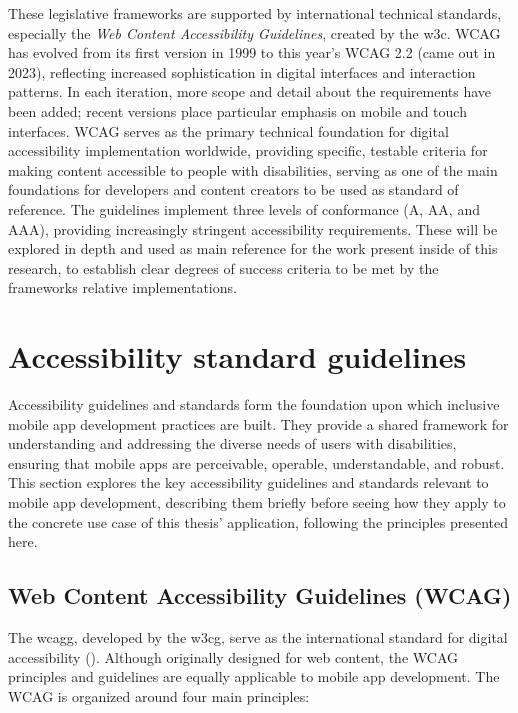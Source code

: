 These legislative frameworks are supported by international technical standards, especially the \textit{Web Content Accessibility Guidelines}, created by the \acrshort{w3c}. WCAG has evolved from its first version in 1999 to this year's WCAG 2.2 (came out in 2023), reflecting increased sophistication in digital interfaces and interaction patterns. In each iteration, more scope and detail about the requirements have been added; recent versions place particular emphasis on mobile and touch interfaces. WCAG serves as the primary technical foundation for digital accessibility implementation worldwide, providing specific, testable criteria for making content accessible to people with disabilities, serving as one of the main foundations for developers and content creators to be used as standard of reference. The guidelines implement three levels of conformance (A, AA, and AAA), providing increasingly stringent accessibility requirements. These will be explored in depth and used as main reference for the work present inside of this research, to establish clear degrees of success criteria to be met by the frameworks relative implementations.

\section{Accessibility standard guidelines}
\label{sec:accessibility-guidelines}

Accessibility guidelines and standards form the foundation upon which inclusive mobile app development practices are built. They provide a shared framework for understanding and addressing the diverse needs of users with disabilities, ensuring that mobile apps are perceivable, operable, understandable, and robust. This section explores the key accessibility guidelines and standards relevant to mobile app development, describing them briefly before seeing how they apply to the concrete use case of this thesis' application, following the principles presented here.

\subsection{Web Content Accessibility Guidelines (WCAG)}

The \gls{wcagg}, developed by the \gls{w3cg}, serve as the international standard for digital accessibility (\cite{site:wcag}). Although originally designed for web content, the WCAG principles and guidelines are equally applicable to mobile app development. The WCAG is organized around four main principles:

